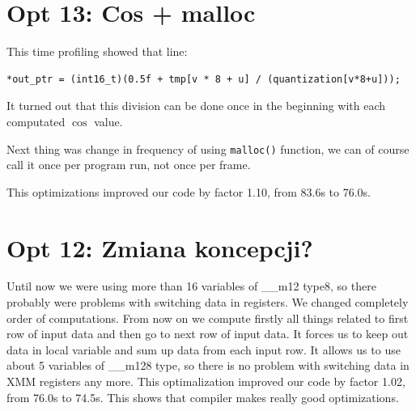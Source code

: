 \documentclass[11pt]{article}
\begin{document}
\section{Opt 13: Cos + malloc}
This time profiling showed that line:
\begin{lstlisting}
*out_ptr = (int16_t)(0.5f + tmp[v * 8 + u] / (quantization[v*8+u]));
\end{lstlisting}
It turned out that this division can be done once in the beginning
with each computated $\cos$ value.

Next thing was change in frequency of using \texttt{malloc()} function,
we can of course call it once per program run, not once per frame.

This optimizations improved our code by factor 1.10, from 83.6s to 76.0s.


\section{Opt 12: Zmiana koncepcji?}
Until now we were using more than 16 variables of \_\_m12 type8,
so there probably were problems with switching data in registers.
We changed completely order of computations. From now on we compute
firstly all things related to first row of input data and then go
to next row of input data. It forces us to keep out data in local
variable and sum up data from each input row. It allows us to use
about 5 variables of \_\_m128 type, so there is no problem with
switching data in XMM registers any more. This optimalization
improved our code by factor 1.02, from 76.0s to 74.5s. This shows
that compiler makes really good optimizations.
\end{document}
